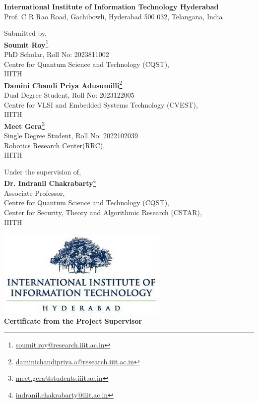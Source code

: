 \begin{center}
\textbf{\Large International Institute of Information Technology Hyderabad}\\
{\small Prof. C R Rao Road, Gachibowli, Hyderabad 500 032,
Telangana, India}\\

\vspace{3em}
	
Submitted by,\\
\textbf{\large Soumit Roy}\footnote{\href{mailto:soumit.roy@research.iiit.ac.in}{soumit.roy@research.iiit.ac.in}}\\
PhD Scholar, Roll No: 2023811002\\
Centre for Quantum Science and Technology (CQST),\\ IIITH\\
\vspace{1em}
\textbf{\large Damini Chandi Priya Adusumilli}\footnote{\href{mailto:daminichandipriya.a@research.iiit.ac.in}{daminichandipriya.a@research.iiit.ac.in}}\\
Dual Degree Student, Roll No: 2023122005 \\
Centre for VLSI and Embedded Systems Technology (CVEST),\\ IIITH\\
\vspace{1em}
\textbf{\large Meet Gera}\footnote{\href{mailto:meet.gera@students.iiit.ac.in}{meet.gera@students.iiit.ac.in}}\\
Single Degree Student, Roll No: 2022102039 \\
Robotics Research Center(RRC),\\ IIITH
\vspace{4em}

Under the supervision of,\\
\textbf{\large Dr. Indranil Chakrabarty}\footnote{\href{mailto:indranil.chakrabarty@iiit.ac.in}{indranil.chakrabarty@iiit.ac.in}}\\
Associate Professor,\\
 Centre for Quantum Science and Technology (CQST),\\
 Center for Security, Theory and Algorithmic Research (CSTAR),\\
IIITH
\end{center}
\newpage
\vspace*{15em}
\begin{center}
	\includegraphics[scale=0.5]{iiit.jpeg}\\
	\vspace{2em}
%
{\huge \textbf{Certificate from the Project Supervisor}}
\end{center} 

